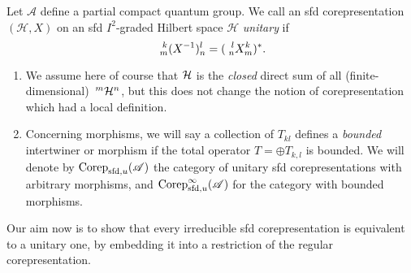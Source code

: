 \begin{Def} Let $\mathscr{A}$ define a partial compact quantum group. We call an sfd corepresentation $(\mathcal{H},X)$ on an sfd $I^2$-graded Hilbert space $\mathcal{H}$
\emph{unitary} if \[\Gr{(X^{-1})}{k}{l}{m}{n}=(\Gr{X}{l}{k}{n}{m})^{*}.\]  
\end{Def} 
\begin{Rem} \begin{enumerate} \item We assume here of course that $\Hsp$ is the \emph{closed} direct sum of all (finite-dimensional) $\Gru{\Hsp}{m}{n}$, but this does not change the notion of corepresentation which had a local definition.
\item Concerning morphisms, we will say a collection of $T_{kl}$ defines a \emph{bounded} intertwiner or morphism if the total operator $T= \oplus T_{k,l}$ is bounded. We will denote by $\Corep_{\sfd,u}(\mathscr{A})$ the category of unitary sfd corepresentations with arbitrary morphisms, and $\Corep_{\sfd,u}^{\infty}(\mathscr{A})$ for the category with bounded morphisms.
\end{enumerate}
\end{Rem}

Our aim now is to show that every irreducible sfd corepresentation is
equivalent to a unitary one, by embedding it into a restriction of the
regular corepresentation.

